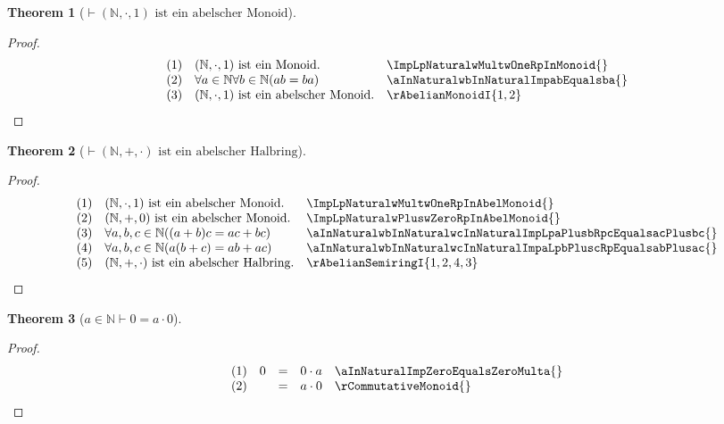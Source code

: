 \documentclass{book}
\theoremstyle{plain}
\newtheorem{theorem}{Theorem}
\theoremstyle{remark}
\theoremstyle{definition}
\begin{document}
\label{ImpLpNaturalwMultwOneRpInAbelMonoid}
\begin{theorem}[\(\vdash (\mathbb{N},\cdot,1) \text{ ist ein abelscher Monoid}\)]
\end{theorem}
\begin{proof}
        \[
	\begin{array}{llll}
                &  (1) & (\mathbb{N},\cdot,1) \text{ ist ein Monoid.} & \ImpLpNaturalwMultwOneRpInMonoid{} \\
                &  (2) & \forall a\in\mathbb{N}\forall b\in\mathbb{N}(ab=ba) & \aInNaturalwbInNaturalImpabEqualsba{} \\
                &  (3) & (\mathbb{N},\cdot,1) \text{ ist ein abelscher Monoid.} & \rAbelianMonoidI{1,2} \\
	\end{array}
	\]
\end{proof}

\label{ImpLpNaturalwMultwOneRpInAbelSemiRing}
\begin{theorem}[\(\vdash (\mathbb{N},+,\cdot) \text{ ist ein abelscher Halbring}\)]
\end{theorem}
\begin{proof}
        \[
	\begin{array}{llll}
                &  (1) & (\mathbb{N},\cdot,1) \text{ ist ein abelscher Monoid.} & \ImpLpNaturalwMultwOneRpInAbelMonoid{} \\
                &  (2) & (\mathbb{N},+,0) \text{ ist ein abelscher Monoid.} & \ImpLpNaturalwPluswZeroRpInAbelMonoid{} \\
                &  (3) & \forall a,b,c\in\mathbb{N}((a+b)c=ac+bc) & \aInNaturalwbInNaturalwcInNaturalImpLpaPlusbRpcEqualsacPlusbc{} \\
                &  (4) & \forall a,b,c\in\mathbb{N}(a(b+c)=ab+ac) & \aInNaturalwbInNaturalwcInNaturalImpaLpbPluscRpEqualsabPlusac{} \\
                &  (5) & (\mathbb{N},+,\cdot) \text{ ist ein abelscher Halbring.} & \rAbelianSemiringI{1,2,4,3} \\
	\end{array}
	\]
\end{proof}

\label{aInNaturalImpZeroEqualsaMultZero}
\begin{theorem}[\(a\in\mathbb{N}\vdash 0=a\cdot 0\)]
\end{theorem}
\begin{proof}
        \[
	\begin{array}{llclll}
                &  (1) & 0&=&0\cdot a & \aInNaturalImpZeroEqualsZeroMulta{} \\
                &  (2) &  &=&a\cdot 0 & \rCommutativeMonoid{} \\
	\end{array}
	\]
\end{proof}
\end{document}
